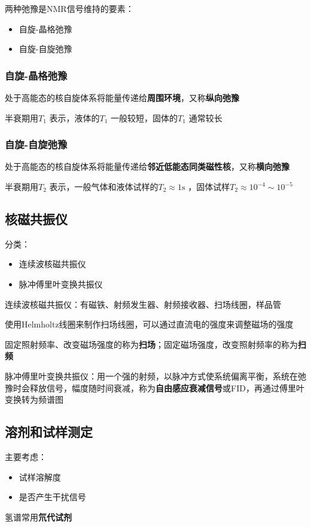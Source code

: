 两种弛豫是NMR信号维持的要素：
\begin{itemize}
    \item 自旋-晶格弛豫
    \item 自旋-自旋弛豫
\end{itemize}
\subsubsection*{自旋-晶格弛豫}%
\label{subsub*:自旋-晶格弛豫}
处于高能态的核自旋体系将能量传递给\textbf{周围环境}，又称\textbf{纵向弛豫}
\begin{notation}
    半衰期用$T_1$ 表示，液体的$T_1$ 一般较短，固体的$T_1$ 通常较长
\end{notation}
\subsubsection*{自旋-自旋弛豫}%
\label{subsub*:自旋-自旋弛豫}
处于高能态的核自旋体系将能量传递给\textbf{邻近低能态同类磁性核}，又称\textbf{横向弛豫}
\begin{notation}
    半衰期用$T_2$ 表示，一般气体和液体试样的$T_2\approx 1\text{s}$ ，固体试样$T_2\approx 10^{-4}\sim 10^{-5}$
\end{notation}
\subsection{核磁共振仪}%
\label{sub:核磁共振仪}
分类：
\begin{itemize}
    \item 连续波核磁共振仪
    \item 脉冲傅里叶变换共振仪
\end{itemize}
\begin{notation}
    连续波核磁共振仪：有磁铁、射频发生器、射频接收器、扫场线圈，样品管

    使用Helmholtz线圈来制作扫场线圈，可以通过直流电的强度来调整磁场的强度
\end{notation}
固定照射频率、改变磁场强度的称为\textbf{扫场}；固定磁场强度，改变照射频率的称为\textbf{扫频}
\begin{notation}
    脉冲傅里叶变换共振仪：用一个强的射频，以脉冲方式使系统偏离平衡，系统在弛豫时会释放信号，幅度随时间衰减，称为\textbf{自由感应衰减信号}或FID，再通过傅里叶变换转为频谱图
\end{notation}
\subsection{溶剂和试样测定}%
\label{sub:溶剂和试样测定}
主要考虑：
\begin{itemize}
    \item 试样溶解度
    \item 是否产生干扰信号
    
\end{itemize}
\begin{eg}
氢谱常用\textbf{氘代试剂}
\end{eg}
